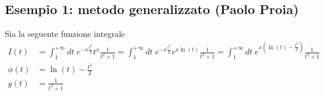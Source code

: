 \newpage

\subsection{Esempio 1: metodo generalizzato (Paolo Proia)}

Sia la seguente funzione integrale
\begin{align}
	I(t)    &= \int_{1}^{+\infty} dt \; e^{-x \frac{t^2}{2}}t^x \frac{1}{t^2 + 1} = \int_{1}^{+\infty} dt \; e^{-x \frac{t^2}{2}} e^{x\ln(t)} \frac{1}{t^2 + 1} = \int_{1}^{+\infty} dt \; e^{x\left(\ln(t) -\frac{t^2}{2}\right)} \frac{1}{t^2 + 1}\\
	\phi(t) &= \ln(t) - \frac{t^2}{2} \\
	g(t)    &= \frac{1}{t^2 + 1}
\end{align}

